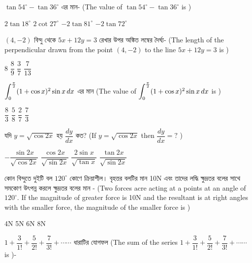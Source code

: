 \documentclass[addpoints]{exam}
\begin{document}
\begin{questions}
\question $ \tan 54^{\circ} -\tan 36^{\circ} $ এর মান- (The value of $ \tan 54^{\circ} -\tan 36^{\circ} $ is )

\begin{oneparchoices}
\choice $ 2\tan 18^{\circ} $
\choice $ 2\cot 27^{\circ} $
\choice $ -2\tan 81^{\circ} $
\choice $ -2\tan 72^{\circ} $
\end{oneparchoices}

 \question $ (4,-2) $ বিন্দু থেকে $ 5x+12y=3 $ রেখার উপর অঙ্কিত লম্বের দৈর্ঘ্য- (The length of the perpendicular drawn from the point $ (4,-2) $ to the line $ 5x+12y=3 $ is  )

\begin{oneparchoices}
\choice $ 8  $
\choice $ \dfrac{8}{9}  $
\choice $ \dfrac{3}{7}  $
\choice $ \dfrac{7}{13} $
\end{oneparchoices}

\question $ \mathlarger{\int_{0}^{\frac{\pi}{2}}} (1+\cos x)^{2}\sin x\,dx $ এর মান (The value of $ \mathlarger{\int_{0}^{\frac{\pi}{2}}} (1+\cos x)^{2}\sin x\,dx $ is )

\begin{oneparchoices}
\choice $ \dfrac{8}{3} $
\choice $ \dfrac{5}{8} $
\choice $ \dfrac{2}{7} $
\choice $ \dfrac{7}{3} $
\end{oneparchoices}

\question যদি $ y=\sqrt{\cos 2x} $ হয় $ \dfrac{dy}{dx} $ কত? (If $ y=\sqrt{\cos 2x} $ then $ \dfrac{dy}{dx} = ?$ )

\begin{oneparchoices}
\choice $ -\dfrac{\sin 2x}{\sqrt{\cos 2x}} $ 
\choice $ \dfrac{\cos 2x}{\sqrt{\sin 2x}} $ 
\choice  $ \dfrac{2\sin x}{\sqrt{\tan x}} $
\choice $ \dfrac{\tan 2x}{\sqrt{\sin 2x}} $
\end{oneparchoices}

\question  কোন বিন্দুতে দুইটি বল $ 120^{\circ} $ কোণে ক্রিয়াশীল। বৃহত্তর বলটির মান 10N এবং তাদের লদ্ধি ক্ষুদ্রতর বলের সাথে সমকোণ উৎপন্ন করলে ক্ষুদ্রতর বলের মান - (Two forces acre acting at a points at an angle of $ 120^{\circ} $. If the magnitude of greater force is 10N and the resultant is at right angles with the smaller force, the magnitude of the smaller force is )


\begin{oneparchoices}
\choice 4N
\choice 5N
\choice 6N
\choice 8N
\end{oneparchoices}

\question $ 1+ \dfrac{3}{1!}+\dfrac{5}{2!}+ \dfrac{7}{3!}+ \cdots \cdots $ ধারাটির যোগফল (The sum of the series $ 1+ \dfrac{3}{1!}+\dfrac{5}{2!}+ \dfrac{7}{3!}+ \cdots \cdots $ is )- 



\end{questions}
\end{document}

